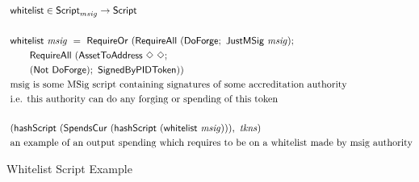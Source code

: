 \begin{figure*}[htb]
  \begin{align*}
    & \mathsf{whitelist} \in\mathsf{Script}_{msig}\to\mathsf{Script}  \\~\\
    & \mathsf{whitelist}  ~\mathit{msig}~ =~ \mathsf{RequireOr}~
      (\mathsf{RequireAll}~(\mathsf{DoForge};~\mathsf{JustMSig}~\mathit{msig});~\\
    &~~~~~~ \mathsf{RequireAll}~(\mathsf{AssetToAddress}~\Diamond~\Diamond ;\\
    &~~~~~~ (\mathsf{Not}~\mathsf{DoForge});~\mathsf{SignedByPIDToken})) \\
    & \text{msig is some MSig script containing signatures of some accreditation authority} \\
    & \text{i.e. this authority can do any forging or spending of this token} \\~\\
    & (\mathsf{hashScript}~(\mathsf{SpendsCur}~(\mathsf{hashScript}~(\mathsf{whitelist}~\mathit{msig}))),~ \mathit{tkns}) \\
    & \text{an example of an output spending which requires to be on a whitelist made by msig authority}
  \end{align*}
  \caption{Whitelist Script Example}
  \label{fig:whitelist-example}
\end{figure*}

